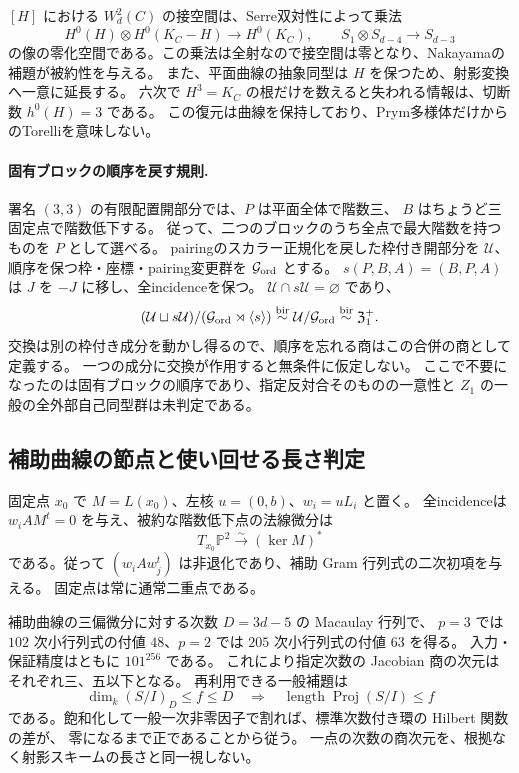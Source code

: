 $[H]$ における $W_d^2(C)$ の接空間は、Serre双対性によって乗法
\[
 H^0(H)\otimes H^0(K_C-H)\longrightarrow H^0(K_C),
 \qquad S_1\otimes S_{d-4}\longrightarrow S_{d-3}
\]
の像の零化空間である。この乗法は全射なので接空間は零となり、Nakayamaの補題が被約性を与える。
また、平面曲線の抽象同型は $H$ を保つため、射影変換へ一意に延長する。
六次で $H^3=K_C$ の根だけを数えると失われる情報は、切断数 $h^0(H)=3$ である。
この復元は曲線を保持しており、Prym多様体だけからのTorelliを意味しない。

\paragraph{固有ブロックの順序を戻す規則.}
署名 $(3,3)$ の有限配置開部分では、$P$ は平面全体で階数三、
$B$ はちょうど三固定点で階数低下する。
従って、二つのブロックのうち全点で最大階数を持つものを $P$ として選べる。
pairingのスカラー正規化を戻した枠付き開部分を $\mathcal U$、
順序を保つ枠・座標・pairing変更群を $\mathcal G_{\rm ord}$ とする。
$s(P,B,A)=(B,P,A)$ は $J$ を $-J$ に移し、全incidenceを保つ。
$\mathcal U\cap s\mathcal U=\varnothing$ であり、
\[
 (\mathcal U\sqcup s\mathcal U)/(\mathcal G_{\rm ord}\rtimes\langle s\rangle)
 \mathrel{\overset{\mathrm{bir}}{\sim}} \mathcal U/\mathcal G_{\rm ord}
 \mathrel{\overset{\mathrm{bir}}{\sim}}\mathfrak Z_1^+.
\]
交換は別の枠付き成分を動かし得るので、順序を忘れる商はこの合併の商として定義する。
一つの成分に交換が作用すると無条件に仮定しない。
ここで不要になったのは固有ブロックの順序であり、指定反対合そのものの一意性と
$Z_1$ の一般の全外部自己同型群は未判定である。




\subsection{補助曲線の節点と使い回せる長さ判定}
固定点 $x_0$ で $M=L(x_0)$、左核 $u=(0,b)$、$w_i=uL_i$ と置く。
全incidenceは $w_iAM^t=0$ を与え、被約な階数低下点の法線微分は
\[
 T_{x_0}\mathbb P^2\xrightarrow{\sim}(\ker M)^*
\]
である。従って $(w_iAw_j^t)$ は非退化であり、補助 Gram 行列式の二次初項を与える。
固定点は常に通常二重点である。

補助曲線の三偏微分に対する次数 $D=3d-5$ の Macaulay 行列で、
$p=3$ では $102$ 次小行列式の付値 $48$、$p=2$ では $205$ 次小行列式の付値 $63$ を得る。
入力・保証精度はともに $101^{256}$ である。
これにより指定次数の Jacobian 商の次元はそれぞれ三、五以下となる。
再利用できる一般補題は
\[
 \dim_k(S/I)_D\le f\le D
 \quad\Longrightarrow\quad
 \operatorname{length}\operatorname{Proj}(S/I)\le f
\]
である。飽和化して一般一次非零因子で割れば、標準次数付き環の Hilbert 関数の差が、
零になるまで正であることから従う。
一点の次数の商次元を、根拠なく射影スキームの長さと同一視しない。

